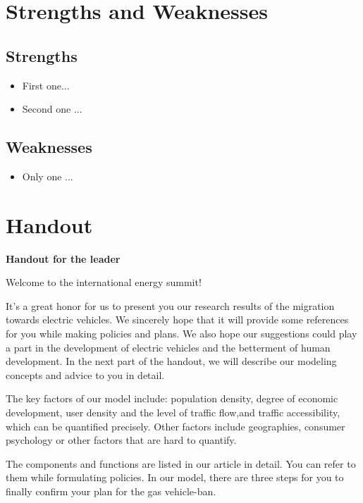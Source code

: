 \documentclass[12pt]{article}  %
\begin{document}
\section{Strengths and Weaknesses}
\subsection{Strengths}
\begin{itemize}
    \item First one...
    \item Second one ...
\end{itemize}

\subsection{Weaknesses}
\begin{itemize}
    \item Only one ...
 \end{itemize}


\section{Handout}
\begin{center}
	\textbf{Handout for the leader}
\end{center}

Welcome to the international energy summit!

It’s a great honor for us to present you our research results of the migration towards electric vehicles. We sincerely hope that it will provide some references for you while making policies and plans. We also hope our suggestions could play a part in the development of electric vehicles and the betterment of human development. In the next part of the handout, we will describe our modeling concepts and advice to you in detail.

The key factors of our model include: population density, degree of economic development, user density and the level of traffic flow,and traffic accessibility, which can be quantified precisely. Other factors include geographies, consumer psychology or other factors that are hard to quantify.

The components and functions are listed in our article in detail. You can refer to them while formulating policies. In our model, there are three steps for you to finally confirm your plan for the gas vehicle-ban.
\end{document}
